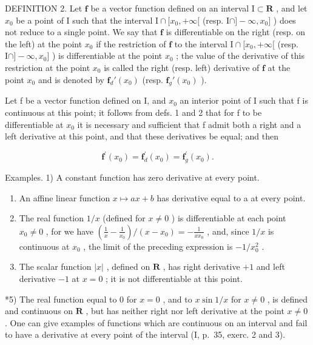 DEFINITION 2. Let \(\mathbf{f}\) be a vector function defined on an interval \(\mathrm{I} \subset \mathbf{R}\) , and let \(x_0\) be a point of \(\mathrm{I}\) such that the interval \(\mathrm{I} \cap [x_0, +\infty[\) (resp. \(\mathrm{I} \cap ] - \infty, x_0]\) ) does not reduce to a single point. We say that \(\mathbf{f}\) is differentiable on the right (resp. on the left) at the point \(x_0\) if the restriction of \(\mathbf{f}\) to the interval \(\mathrm{I} \cap [x_0, +\infty[\) (resp. \(\mathrm{I} \cap ] - \infty, x_0]\) ) is differentiable at the point \(x_0\) ; the value of the derivative of this restriction at the point \(x_0\) is called the right (resp. left) derivative of \(\mathbf{f}\) at the point \(x_0\) and is denoted by \(\mathbf{f}_d'(x_0)\) (resp. \(\mathbf{f}_g'(x_0)\) ).

Let f be a vector function defined on I, and \(x_{0}\) an interior point of I such that f is continuous at this point; it follows from defs. 1 and 2 that for f to be differentiable at \(x_{0}\) it is necessary and sufficient that f admit both a right and a left derivative at this point, and that these derivatives be equal; and then

\[
\mathbf {f} ^ {\prime} (x _ {0}) = \mathbf {f} _ {d} ^ {\prime} (x _ {0}) = \mathbf {f} _ {g} ^ {\prime} (x _ {0}).
\]

Examples. 1) A constant function has zero derivative at every point.

\begin{enumerate}
\def\labelenumi{\arabic{enumi})}
\setcounter{enumi}{1}
\item
  An affine linear function \(x \mapsto ax + b\) has derivative equal to a at every point.
\item
  The real function \(1 / x\) (defined for \(x \neq 0\) ) is differentiable at each point \(x_0 \neq 0\) , for we have \(\left(\frac{1}{x} - \frac{1}{x_0}\right) / (x - x_0) = -\frac{1}{xx_0}\) , and, since \(1 / x\) is continuous at \(x_0\) , the limit of the preceding expression is \(-1 / x_0^2\) .
\item
  The scalar function \(|x|\) , defined on \(\mathbf{R}\) , has right derivative \(+1\) and left derivative \(-1\) at \(x = 0\) ; it is not differentiable at this point.
\end{enumerate}

*5) The real function equal to 0 for \(x = 0\) , and to \(x \sin 1/x\) for \(x \neq 0\) , is defined and continuous on \(\mathbf{R}\) , but has neither right nor left derivative at the point \(x \neq 0\) . One can give examples of functions which are continuous on an interval and fail to have a derivative at every point of the interval (I, p.~35, exerc. 2 and 3).

